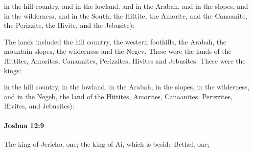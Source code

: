 			\begin{versebox}
					\item[BHS] 
					\item[ASV] in the hill-country, and in the lowland, and in the Arabah, and in the slopes, and in the wilderness, and in the South; the Hittite, the Amorite, and the Canaanite, the Perizzite, the Hivite, and the Jebusite):
					\item[NIV] The lands included the hill country, the western foothills, the Arabah, the mountain slopes, the wilderness and the Negev. These were the lands of the Hittites, Amorites, Canaanites, Perizzites, Hivites and Jebusites. These were the kings:
					\item[NRSV] in the hill country, in the lowland, in the Arabah, in the slopes, in the wilderness, and in the Negeb, the land of the Hittites, Amorites, Canaanites, Perizzites, Hivites, and Jebusites):
			\end{versebox}

		\paragraph{Joshua 12:9} %
			\label{JOSHUA-12-9}

			The king of Jericho, one; the king of Ai, which is beside Bethel, one;

